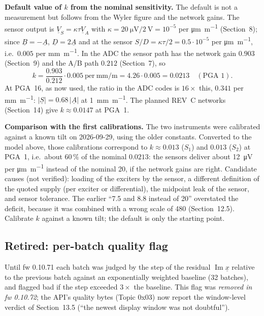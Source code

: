 \documentclass[11pt,a4paper]{article}
\begin{document}
\textbf{Default value of $k$ from the nominal sensitivity.}  The default is not
a measurement but follows from the Wyler figure and the network gains.  The
sensor output is $\underline{V}_S=\kappa\tau\underline{V}_A$ with
$\kappa=\SI{20}{\micro\volt}/\SI{2}{\volt}=10^{-5}$ per \si{\micro\metre\per\metre}
(Section~8); since $\underline{B}=-\underline{A}$, $\underline{D}=2\underline{A}$ and
at the sensor $S/D=\kappa\tau/2=0.5\cdot10^{-5}$ per \si{\micro\metre\per\metre},
i.e.\ $0.005$ per \si{\milli\metre\per\metre}.  In the ADC the sensor path has the
network gain $0.903$ (Section~9) and the A/B path $0.212$ (Section~7), so
\begin{equation}
  k = \frac{0.903}{0.212}\cdot 0.005\ \text{per}\ \si{\milli\metre\per\metre}
    = 4.26\cdot0.005 = 0.0213\quad(\text{PGA }1).
\end{equation}
At PGA~16, as now used, the ratio in the ADC codes is $16\times$ this,
$0.341$ per \si{\milli\metre\per\metre}: $|\underline{S}|=0.68\,|\underline{A}|$ at
\SI{1}{\milli\metre\per\metre}.  The planned REV~C networks (Section~14) give
$k\approx0.0147$ at PGA~1.

\textbf{Comparison with the first calibrations.}  The two instruments were calibrated
against a known tilt on 2026-09-29, using the older constants.  Converted to the
model above, those calibrations correspond to $k\approx0.013$ ($S_1$) and
$0.013$ ($S_2$) at PGA~1, i.e.\ about $60\,\%$ of the nominal $0.0213$: the sensors
deliver about \SI{12}{\micro\volt} per \si{\micro\metre\per\metre} instead of the
nominal 20, if the network gains are right.  Candidate causes (not verified):
loading of the exciters by the sensor, a different definition of the quoted supply
(per exciter or differential), the midpoint leak of the sensor, and sensor
tolerance.  The earlier ``7.5 and 8.8 instead of 20'' overstated the deficit,
because it was combined with a wrong scale of 480 (Section~12.5).  Calibrate $k$
against a known tilt; the default is only the starting point.

\subsection{Retired: per-batch quality flag}

Until fw 0.10.71 each batch was judged by the step of the residual
$\operatorname{Im}\underline{x}$ relative to the previous batch against an
exponentially weighted baseline (32 batches), and flagged bad if the step
exceeded $3\times$ the baseline.  This flag was \emph{removed in fw 0.10.72}; the
API's quality bytes (Topic 0x03) now report the window-level verdict of
Section~13.5 (``the newest display window was not doubtful'').
\end{document}
